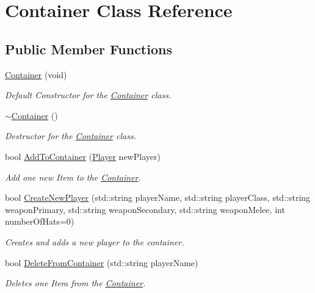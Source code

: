 \hypertarget{class_container}{}\section{Container Class Reference}
\label{class_container}
\subsection*{Public Member Functions}
\begin{DoxyCompactItemize}
\item 
\hyperlink{class_container_a5231ead51bcdd1a9b1f497414e76b6f4}{Container} (void)
\begin{DoxyCompactList}\small\item\em Default Constructor for the \hyperlink{class_container}{Container} class. \end{DoxyCompactList}\item 
\hyperlink{class_container_ae9f5d07bfc3defda274aa06091c19f56}{$\sim$\+Container} ()
\begin{DoxyCompactList}\small\item\em Destructor for the \hyperlink{class_container}{Container} class. \end{DoxyCompactList}\item 
bool \hyperlink{class_container_adcb2699db821af086db2fbce6a9470e1}{Add\+To\+Container} (\hyperlink{class_player}{Player} new\+Player)
\begin{DoxyCompactList}\small\item\em Add one new Item to the \hyperlink{class_container}{Container}. \end{DoxyCompactList}\item 
bool \hyperlink{class_container_a7a2634d599cbf831aba29062fdbbd1a2}{Create\+New\+Player} (std\+::string player\+Name, std\+::string player\+Class, std\+::string weapon\+Primary, std\+::string weapon\+Secondary, std\+::string weapon\+Melee, int number\+Of\+Hats=0)
\begin{DoxyCompactList}\small\item\em Creates and adds a new player to the container. \end{DoxyCompactList}\item 
bool \hyperlink{class_container_a80c04381837dce92a2b7e466ebd087e8}{Delete\+From\+Container} (std\+::string player\+Name)
\begin{DoxyCompactList}\small\item\em Deletes one Item from the \hyperlink{class_container}{Container}. \end{DoxyCompactList}\item 

\end{DoxyCompactItemize}
